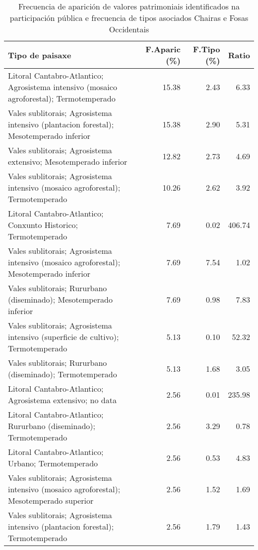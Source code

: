 \begin{table}[p]
\centering
\caption{Frecuencia de aparición de valores patrimoniais identificados na participación pública e frecuencia de tipos asociados Chairas e Fosas Occidentais} 
\label{vsixotpat11}
\begin{tabular}{lrrr}
  \hline
Tipo de paisaxe & F.Aparic (\%) & F.Tipo (\%) & Ratio \\ 
  \hline
Litoral Cantabro-Atlantico; Agrosistema intensivo (mosaico agroforestal); Termotemperado & 15.38 & 2.43 & 6.33 \\ 
  Vales sublitorais; Agrosistema intensivo (plantacion forestal); Mesotemperado inferior & 15.38 & 2.90 & 5.31 \\ 
  Vales sublitorais; Agrosistema extensivo; Mesotemperado inferior & 12.82 & 2.73 & 4.69 \\ 
  Vales sublitorais; Agrosistema intensivo (mosaico agroforestal); Termotemperado & 10.26 & 2.62 & 3.92 \\ 
  Litoral Cantabro-Atlantico; Conxunto Historico; Termotemperado & 7.69 & 0.02 & 406.74 \\ 
  Vales sublitorais; Agrosistema intensivo (mosaico agroforestal); Mesotemperado inferior & 7.69 & 7.54 & 1.02 \\ 
  Vales sublitorais; Rururbano (diseminado); Mesotemperado inferior & 7.69 & 0.98 & 7.83 \\ 
  Vales sublitorais; Agrosistema intensivo (superficie de cultivo); Termotemperado & 5.13 & 0.10 & 52.32 \\ 
  Vales sublitorais; Rururbano (diseminado); Termotemperado & 5.13 & 1.68 & 3.05 \\ 
  Litoral Cantabro-Atlantico; Agrosistema extensivo; no data & 2.56 & 0.01 & 235.98 \\ 
  Litoral Cantabro-Atlantico; Rururbano (diseminado); Termotemperado & 2.56 & 3.29 & 0.78 \\ 
  Litoral Cantabro-Atlantico; Urbano; Termotemperado & 2.56 & 0.53 & 4.83 \\ 
  Vales sublitorais; Agrosistema intensivo (mosaico agroforestal); Mesotemperado superior & 2.56 & 1.52 & 1.69 \\ 
  Vales sublitorais; Agrosistema intensivo (plantacion forestal); Termotemperado & 2.56 & 1.79 & 1.43 \\ 
   \hline
\end{tabular}
\end{table}
